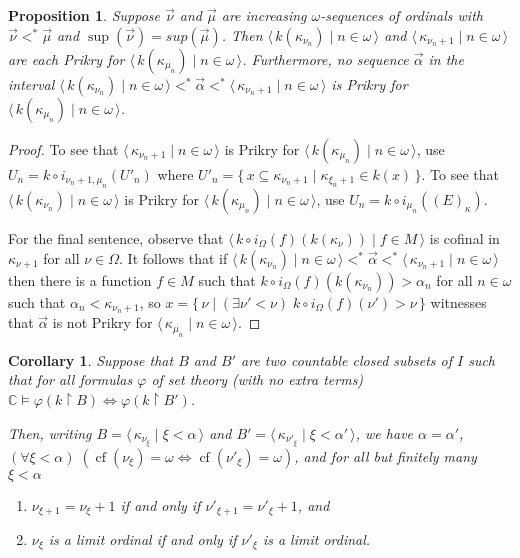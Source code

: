 \documentclass[
twoside,
]{article}
\newtheorem{proposition}[theorem]{Proposition}
\newtheorem{corollary}[theorem]{Corollary}
\theoremstyle{definition}
\theoremstyle{remark}
\newcommand{\ufFromExt}[2]{(#1)_{#2}}
\newcommand{\ords}{\Omega}
\renewcommand{\phi}{\varphi}
\newcommand{\set}[1]{\{\,#1\,\}}
\newcommand{\pair}[1]{\langle#1\rangle}
\newcommand{\seq}[1]{\pair{\,#1\,}}
\newcommand{\restrict}{{\upharpoonright}}
\DeclareMathOperator{\cof}{cf}
\newcommand\chang{\mathbb{C}}
\begin{document}
\begin{proposition}
    Suppose $\vec\nu$ and $\vec\mu$ are 
    increasing $\omega$-sequences of ordinals with
    $\vec\nu<^*\vec\mu$ and $\sup(\vec{\nu})=sup(\vec\mu)$.   Then
    $\seq{k(\kappa_{\nu_n})\mid n\in\omega}$ and 
    $\seq{\kappa_{\nu_n+1}\mid n\in\omega}$ are each Prikry for
    $\seq{k(\kappa_{\mu_n})\mid n\in\omega}$.  Furthermore,
    no sequence $\vec\alpha$ in the interval 
    $\seq{k(\kappa_{\nu_n})\mid n\in\omega}
    <^*\vec\alpha<^*\seq{\kappa_{\nu_n+1}\mid n \in\omega}$ 
    is Prikry for     $\seq{k(\kappa_{\mu_n})\mid n\in\omega} $.
\end{proposition}
\begin{proof}
  To see that  $\seq{\kappa_{\nu_n+1}\mid n\in\omega}$ is Prikry for
  $\seq{k(\kappa_{\mu_n})\mid n\in\omega}$, use $U_n=k\circ
    i_{\nu_n+1,\mu_n}(U'_n)$ where
    $U'_n=\set{x\subseteq\kappa_{\nu_n+1}\mid \kappa_{\xi_n+1}\in k(x)}$.
    To see that $\seq{k(\kappa_{\nu_n})\mid n\in\omega}$ is Prikry for
    $\seq{k(\kappa_{\mu_n})\mid n\in\omega}$, use  $U_n=k\circ
    i_{\mu_n}(\ufFromExt{E}{\kappa})$. 

    For the final sentence, observe that $\seq{k\circ
      i_{\ords}(f)(k(\kappa_{\nu}))\mid f\in M}$ is cofinal in
    $\kappa_{\nu+1}$ for all $\nu\in\ords$.   It follows that if 
    $\seq{k(\kappa_{\nu_n})\mid n\in\omega}
    <^*\vec\alpha<^*\seq{\kappa_{\nu_n+1}\mid n  \in\omega}$
    then there is a function $f\in M$ such that
    $k\circ i_{\ords}(f)(k(\kappa_{\nu_n}))>\alpha_n$ for all $n\in\omega$ such
    that $\alpha_n< \kappa_{\nu_n+1}$, so
    $x=\set{\nu\mid(\exists\nu'<\nu) \;k\circ i_{\ords}(f)(\nu')>\nu}$ witnesses that
    $\vec\alpha$ is not Prikry for $\seq{\kappa_{\mu_n}\mid n\in\omega}$.
\end{proof}
\begin{corollary}
  \label{thm:counterexample}
  Suppose that $B$ and $B'$ are two countable closed subsets of $I$
  such that for all formulas $\phi$
  of set theory (with no extra terms) $\chang\models\phi(k\restrict
  B)\iff\phi(k\restrict B')$.
  
  Then, writing $B=\seq{\kappa_{\nu_{\xi}}\mid\xi<\alpha}$ and
  $B'=\seq{\kappa_{\nu'_{\xi}}\mid\xi<\alpha'}$, we have
  $\alpha=\alpha'$,   $(\forall\xi<\alpha)\;(\cof(\nu_\xi)=\omega\iff\cof(\nu'_{\xi})=\omega)$,
  and 
  for all but finitely many $\xi<\alpha$
  \begin{enumerate}
  \item $\nu_{\xi+1}=\nu_{\xi}+1$ if and only if
    $\nu'_{\xi+1}=\nu'_{\xi}+1$, and 
  \item $\nu_{\xi}$ is a limit ordinal if and only if $\nu'_{\xi}$
    is
    a limit ordinal.
  \end{enumerate}
\end{corollary}
\end{document}
